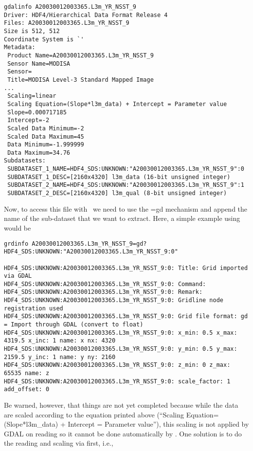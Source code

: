 \begin{verbatim}
gdalinfo A20030012003365.L3m_YR_NSST_9
Driver: HDF4/Hierarchical Data Format Release 4
Files: A20030012003365.L3m_YR_NSST_9
Size is 512, 512
Coordinate System is `'
Metadata:
 Product Name=A20030012003365.L3m_YR_NSST_9
 Sensor Name=MODISA
 Sensor=
 Title=MODISA Level-3 Standard Mapped Image
...
 Scaling=linear
 Scaling Equation=(Slope*l3m_data) + Intercept = Parameter value
 Slope=0.000717185
 Intercept=-2
 Scaled Data Minimum=-2
 Scaled Data Maximum=45
 Data Minimum=-1.999999
 Data Maximum=34.76
Subdatasets:
 SUBDATASET_1_NAME=HDF4_SDS:UNKNOWN:"A20030012003365.L3m_YR_NSST_9":0
 SUBDATASET_1_DESC=[2160x4320] l3m_data (16-bit unsigned integer)
 SUBDATASET_2_NAME=HDF4_SDS:UNKNOWN:"A20030012003365.L3m_YR_NSST_9":1
 SUBDATASET_2_DESC=[2160x4320] l3m_qual (8-bit unsigned integer)
\end{verbatim}

Now, to access this file with \GMT\ we need to use the =gd mechanism and append the name
of the sub-dataset that we want to extract. Here, a simple example using 
would be

\scriptsize
\begin{verbatim}
grdinfo A20030012003365.L3m_YR_NSST_9=gd?HDF4_SDS:UNKNOWN:"A20030012003365.L3m_YR_NSST_9:0"

HDF4_SDS:UNKNOWN:A20030012003365.L3m_YR_NSST_9:0: Title: Grid imported via GDAL
HDF4_SDS:UNKNOWN:A20030012003365.L3m_YR_NSST_9:0: Command:
HDF4_SDS:UNKNOWN:A20030012003365.L3m_YR_NSST_9:0: Remark:
HDF4_SDS:UNKNOWN:A20030012003365.L3m_YR_NSST_9:0: Gridline node registration used
HDF4_SDS:UNKNOWN:A20030012003365.L3m_YR_NSST_9:0: Grid file format: gd = Import through GDAL (convert to float)
HDF4_SDS:UNKNOWN:A20030012003365.L3m_YR_NSST_9:0: x_min: 0.5 x_max: 4319.5 x_inc: 1 name: x nx: 4320
HDF4_SDS:UNKNOWN:A20030012003365.L3m_YR_NSST_9:0: y_min: 0.5 y_max: 2159.5 y_inc: 1 name: y ny: 2160
HDF4_SDS:UNKNOWN:A20030012003365.L3m_YR_NSST_9:0: z_min: 0 z_max: 65535 name: z
HDF4_SDS:UNKNOWN:A20030012003365.L3m_YR_NSST_9:0: scale_factor: 1 add_offset: 0
\end{verbatim}
\normalsize

Be warned, however, that things are not yet completed because while the data are scaled
according to the equation printed above (``Scaling Equation=(Slope*l3m\_data) + Intercept
= Parameter value''), this scaling is not applied by GDAL on reading so it cannot be done
automatically by \GMT. One solution is to do the reading and scaling via 
first, i.e.,

